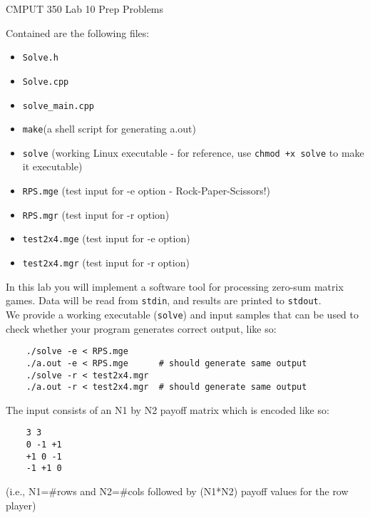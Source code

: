 \documentclass[a4paper,11pt]{article}
\begin{document}

\begin{center}
{\Large CMPUT 350 Lab 10 Prep Problems}
\end{center}


\linerule

Contained are the following files:
\begin{itemize}
    \item \texttt{Solve.h}
    \item \texttt{Solve.cpp}
    \item \texttt{solve\_main.cpp}
    \item \texttt{make}(a shell script for generating a.out)        
    \item \texttt{solve} (working Linux executable - for reference, 
        use \texttt{chmod +x solve} to make it executable)
    \item \texttt{RPS.mge} (test input for -e option - Rock-Paper-Scissors!)
    \item \texttt{RPS.mgr} (test input for -r option)
    \item \texttt{test2x4.mge} (test input for -e option)
    \item \texttt{test2x4.mgr} (test input for -r option)
\end{itemize}

In this lab you will implement a software tool for processing zero-sum matrix games.
Data will be read from \texttt{stdin}, and results are printed to \texttt{stdout}. \\

We provide a working executable (\texttt{solve}) and input samples that can
be used to check whether your program generates correct output, like so:
{\small 
\begin{verbatim}
    ./solve -e < RPS.mge
    ./a.out -e < RPS.mge      # should generate same output
    ./solve -r < test2x4.mgr
    ./a.out -r < test2x4.mgr  # should generate same output
\end{verbatim}
}

The input consists of an N1 by N2 payoff matrix which is encoded like so:
{\small 
\begin{verbatim}
    3 3
    0 -1 +1
    +1 0 -1
    -1 +1 0
\end{verbatim}
}
(i.e., N1=\#rows and N2=\#cols followed by (N1*N2) payoff values for the row player) \\
\end{document}
